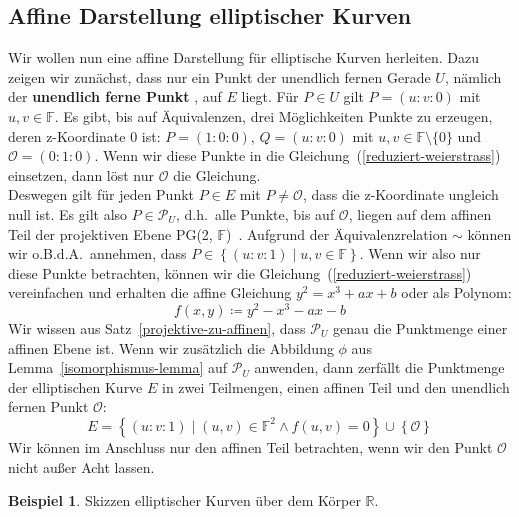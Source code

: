 \documentclass[hidelinks]{article}
\theoremstyle{plain}
\theoremstyle{definition}
\newtheorem{bsp}[thm]{Beispiel}
\theoremstyle{rem}
\newcommand{\pgtwo}{PG(2, $\mathbb{F}$)\ }
\newcommand{\fnz}{\mathbb{F}\setminus\{0\}}
\newcommand{\pu}{\mathcal{P}_U}
\newcommand{\patinf}{\mathcal{O}}
\begin{document}
\begin{sloppypar}
\subsection{Affine Darstellung elliptischer Kurven} \label{affine-darstellung}
Wir wollen nun eine affine Darstellung für elliptische Kurven herleiten. Dazu zeigen wir zunächst, dass nur ein Punkt der unendlich fernen Gerade $U$, nämlich der \textbf{unendlich ferne Punkt} \makebox{$\patinf = (0:1:0)$}, auf $E$ liegt. Für $P \in U$ gilt $P = (u:v:0)$ mit $u,v \in \mathbb{F}$. Es gibt, bis auf Äquivalenzen, drei Möglichkeiten Punkte zu erzeugen, deren z-Koordinate 0 ist: $P = (1:0:0)$, $Q = (u:v:0)$ mit $u,v \in \fnz$ und $\patinf = (0:1:0)$. 
Wenn wir diese Punkte in die Gleichung~(\ref{reduziert-weierstrass}) einsetzen, dann löst nur $\patinf$ die Gleichung.\\ 
Deswegen gilt für jeden Punkt $P \in E$ mit $P \neq \patinf$, dass die z-Koordinate ungleich null ist. Es gilt also $P \in \pu$, d.h.\ alle Punkte, bis auf $\patinf$, liegen auf dem affinen Teil der projektiven Ebene \pgtwo. 
Aufgrund der Äquivalenzrelation $\sim$ können wir o.B.d.A.\ annehmen, dass $P \in \left\{(u:v:1) \mid u,v \in \mathbb{F} \right\}$. Wenn wir also nur diese Punkte betrachten, können wir die Gleichung~(\ref{reduziert-weierstrass}) vereinfachen und erhalten die affine Gleichung $y^2 = x^3 + ax + b$ oder als Polynom: 
\begin{equation} \label{affines-polynom}
    f(x,y) \coloneqq y^2 - x^3 - ax - b
\end{equation}
Wir wissen aus Satz~\ref{projektive-zu-affinen}, dass $\pu$ genau die Punktmenge einer affinen Ebene ist. Wenn wir zusätzlich die Abbildung $\phi$ aus Lemma~\ref{isomorphismus-lemma} auf $\pu$ anwenden, dann zerfällt die Punktmenge der elliptischen Kurve $E$ in zwei Teilmengen, einen affinen Teil und den unendlich fernen Punkt $\patinf$:
\begin{equation} \label{elliptic-curve-aff-inf}
    E = \left\{(u:v:1) \mid (u,v) \in \mathbb{F}^2 \land f(u,v) = 0 \right\} \cup \left\{ \patinf \right\}
\end{equation}
Wir können im Anschluss nur den affinen Teil betrachten, wenn wir den Punkt $\patinf$ nicht außer Acht lassen.
\begin{bsp}
    Skizzen elliptischer Kurven über dem Körper $\mathbb{R}$.
    \begin{figure}[H]
        \centering
        \subfloat[$y^2=x^3 + 0.5x + 2$]{
            \begin{tikzpicture}
                \begin{axis}[
                    axis equal, 
                    scale=0.8
                    ]

\end{axis}
\end{tikzpicture}}
\end{figure}
\end{bsp}
\end{sloppypar}
\end{document}
